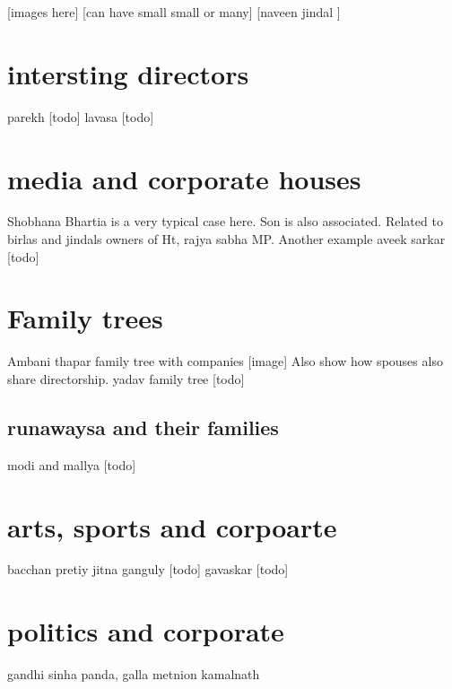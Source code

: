 [images here]
[can have small small or many]
[naveen jindal ]

\section{intersting directors}
parekh [todo]
lavasa [todo]

\section{media and corporate houses}
Shobhana Bhartia is a very typical case here. Son is also associated. Related to birlas and jindals owners of Ht, rajya sabha MP.
Another example aveek sarkar [todo] 

\section{Family trees}
Ambani
thapar family tree with companies [image]
Also show how spouses also share directorship.
yadav family tree [todo]

\subsection{runawaysa and their families}
modi and mallya [todo]

\section{arts, sports and corpoarte}
bacchan
pretiy jitna
ganguly [todo]
gavaskar [todo]

\section{politics and corporate}
gandhi
sinha
panda, galla metnion
kamalnath
